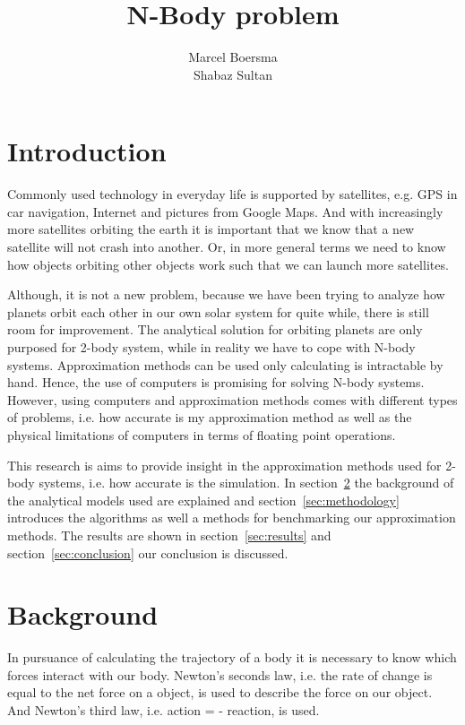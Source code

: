 \documentclass[11pt]{article} %
\title{N-Body problem}
\author{Marcel Boersma\\Shabaz Sultan}
\begin{document}
\maketitle

\section{Introduction}
Commonly used technology in everyday life is supported by satellites, e.g. GPS in car navigation, Internet and pictures from Google Maps. 
And with increasingly more satellites orbiting the earth it is important that we know that a new satellite will not crash into another.
Or, in more general terms we need to know how objects orbiting other objects work such that we can launch more satellites.

Although, it is not a new problem, because we have been trying to analyze how planets orbit each other in our own solar system for quite while, there is still room for improvement.
The analytical solution for orbiting planets are only purposed for 2-body system, while in reality we have to cope with N-body systems. Approximation methods can be used only calculating is intractable by hand. Hence, the use of computers is promising for solving N-body systems. However, using computers and approximation methods comes with different types of problems, i.e. how accurate is my approximation method as well as the physical limitations of computers in terms of floating point operations.

This research is aims to provide insight in the approximation methods used for 2-body systems, i.e. how accurate is the simulation. 
In section~\ref{sec:literature} the background of the analytical models used are explained and section~\ref{sec:methodology} introduces the algorithms as well a methods for benchmarking our approximation methods. The results are shown in section~\ref{sec:results} and section~\ref{sec:conclusion} our conclusion is discussed.

\section{Background}
\label{sec:literature}
In pursuance of calculating the trajectory of a body it is necessary to know which forces interact with our body. Newton's seconds law, i.e. the rate of change is equal to the net force on a object, is used to describe the force on our object. And Newton's third law, i.e. action = - reaction, is used. 
\end{document}
